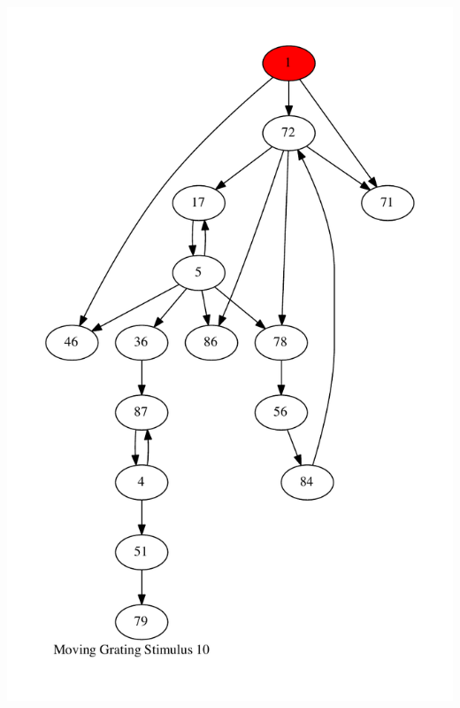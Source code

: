 \documentclass{article}
\begin{document}
\newpage
\includegraphics[max height=\textheight,max width=\textwidth]{stim_mov_grat/stim10_pp.pdf}
\end{document}
